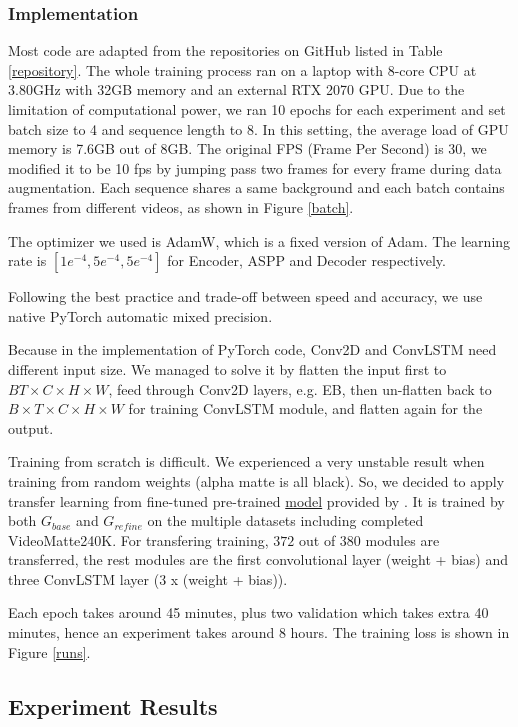 \documentclass[final]{cvpr}
\begin{document}
\subsubsection{Implementation}

Most code are adapted from the repositories on GitHub listed in Table \ref{repository}.
The whole training process ran on a laptop with 8-core CPU at 3.80GHz with 32GB memory and an external RTX 2070 GPU.
Due to the limitation of computational power, we ran 10 epochs for each experiment and set batch size to 4 and sequence length to 8.
In this setting, the average load of GPU memory is 7.6GB out of 8GB.
The original FPS (Frame Per Second) is 30, we modified it to be 10 fps by jumping pass two frames for every frame during data augmentation.
Each sequence shares a same background and each batch contains frames from different videos, as shown in Figure \ref{batch}.

The optimizer we used is AdamW, which is a fixed version of Adam.
The learning rate is $[1e^{-4},5e^{-4},5e^{-4}]$ for Encoder, ASPP and Decoder respectively.

Following the best practice and trade-off between speed and accuracy, we use native PyTorch automatic mixed precision.

Because in the implementation of PyTorch code, Conv2D and ConvLSTM need different input size.
We managed to solve it by flatten the input first to $BT\times C\times H \times W$, feed through Conv2D layers, e.g. EB, then un-flatten back to $B\times T\times C\times H \times W$ for training ConvLSTM module, and flatten again for the output.

Training from scratch is difficult.
We experienced a very unstable result when training from random weights (alpha matte is all black).
So, we decided to apply transfer learning from fine-tuned pre-trained \href{https://drive.google.com/drive/folders/1cbetlrKREitIgjnIikG1HdM4x72FtgBh}{model} provided by \cite{linRealTimeHighResolutionBackground2020a}.
It is trained by both $G_{base}$ and $G_{refine}$ on the multiple datasets including completed VideoMatte240K.
For transfering training, $372$ out of $380$ modules are transferred, the rest modules are the first convolutional layer (weight + bias) and three ConvLSTM layer (3 x (weight + bias)).

Each epoch takes around 45 minutes, plus two validation which takes extra 40 minutes, hence an experiment takes around 8 hours.
The training loss is shown in Figure \ref{runs}.

\subsection{Experiment Results}
\end{document}

